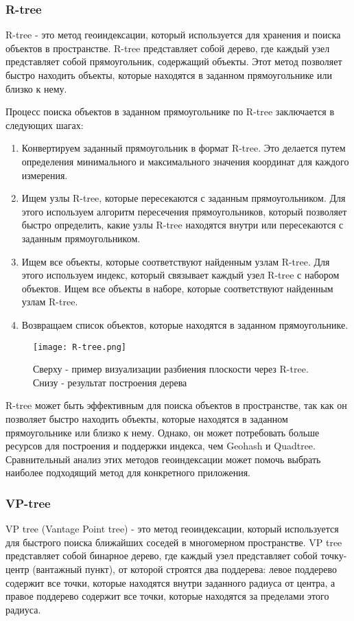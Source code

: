 \subsubsection{R-tree}
R-tree - это метод геоиндексации, который используется для хранения и поиска объектов в пространстве. R-tree представляет собой дерево, где каждый узел представляет собой прямоугольник, содержащий объекты. Этот метод позволяет быстро находить объекты, которые находятся в заданном прямоугольнике или близко к нему.

Процесс поиска объектов в заданном прямоугольнике по R-tree заключается в следующих шагах:

\begin{enumerate}
    \item Конвертируем заданный прямоугольник в формат R-tree. Это делается путем определения минимального и максимального значения координат для каждого измерения.
    \item Ищем узлы R-tree, которые пересекаются с заданным прямоугольником. Для этого используем алгоритм пересечения прямоугольников, который позволяет быстро определить, какие узлы R-tree находятся внутри или пересекаются с заданным прямоугольником.
    \item Ищем все объекты, которые соответствуют найденным узлам R-tree. Для этого используем индекс, который связывает каждый узел R-tree с набором объектов. Ищем все объекты в наборе, которые соответствуют найденным узлам R-tree.
    \item Возвращаем список объектов, которые находятся в заданном прямоугольнике.
\end{enumerate}

\begin{figure}[h]
    \centering
    \texttt{[image: R-tree.png]}
    \caption{Сверху - пример визуализации разбиения плоскости через R-tree. Снизу - результат построения дерева}
\end{figure}

R-tree может быть эффективным для поиска объектов в пространстве, так как он позволяет быстро находить объекты, которые находятся в заданном прямоугольнике или близко к нему. Однако, он может потребовать больше ресурсов для построения и поддержки индекса, чем Geohash и Quadtree. Сравнительный анализ этих методов геоиндексации может помочь выбрать наиболее подходящий метод для конкретного приложения.

\subsubsection{VP-tree}
VP tree (Vantage Point tree) - это метод геоиндексации, который используется для быстрого поиска ближайших соседей в многомерном пространстве. VP tree представляет собой бинарное дерево, где каждый узел представляет собой точку-центр (вантажный пункт), от которой строятся два поддерева: левое поддерево содержит все точки, которые находятся внутри заданного радиуса от центра, а правое поддерево содержит все точки, которые находятся за пределами этого радиуса.

